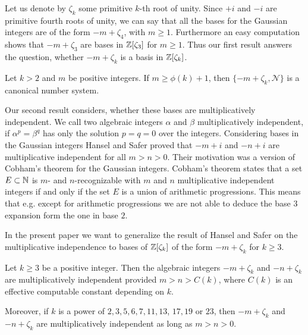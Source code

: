 Let us denote by $\zeta_k$ some primitive $k$-th root of unity. Since
$+i$ and $-i$ are primitive fourth roots of unity, we can say that all
the bases for the Gaussian integers are of the form $-m+\zeta_4$, with
$m\geq 1$. Furthermore an easy computation shows that $-m+\zeta_3$ are
bases in ${\mathbb Z}[\zeta_3]$ for $m\geq1$. Thus our first result answers the
question, whether $-m+\zeta_k$ is a basis in ${\mathbb Z}[\zeta_k]$.

\begin{theorem}\label{th:bases}
  Let $k>2$ and $m$ be positive integers. If $m\geq\phi(k)+1$, then
  $\{-m+\zeta_k,\mathcal{N}\}$ is a canonical number system.
\end{theorem}

Our second result considers, whether these bases are multiplicatively
independent. We call two algebraic integers $\alpha$ and $\beta$
multiplicatively independent, if $\alpha^p=\beta^q$ has only the
solution $p=q=0$ over the integers. Considering bases in the Gaussian
integers Hansel and Safer \cite{hansel_safer2003:vers_un_theoreme}
proved that $-m+i$ and $-n+i$ are multiplicative independent for all
$m>n>0$. Their motivation was a version of Cobham's theorem
\cite{cobham1972:uniform_tag_sequences} for the Gaussian
integers. Cobham's theorem states that a set $E\subset{\mathbb N}$ is $m$- and
$n$-recognizable with $m$ and $n$ multiplicative independent integers
if and only if the set $E$ is a union of arithmetic progressions. This
means that e.g. except for arithmetic progressions we are not able to
deduce the base $3$ expansion form the one in base $2$.

In the present paper we want to generalize the result of Hansel and
Safer \cite{hansel_safer2003:vers_un_theoreme} on the multiplicative
independence to bases of ${\mathbb Z}[\zeta_k]$ of the form $-m+\zeta_k$ for
$k\geq3$.

\begin{theorem}\label{th:mult_independent}
  Let $k\geq3$ be a positive integer. Then the algebraic integers
  $-m+\zeta_k$ and $-n+\zeta_k$ are multiplicatively independent
  provided $m>n>C(k)$, where $C(k)$ is an effective computable
  constant depending on $k$.

  Moreover, if $k$ is a power of $2,3,5,6,7,11,13$, $17,19$ or $23$,
  then $-m+\zeta_k$ and $-n+\zeta_k$ are multiplicatively independent
  as long as $m>n>0$.
\end{theorem}

